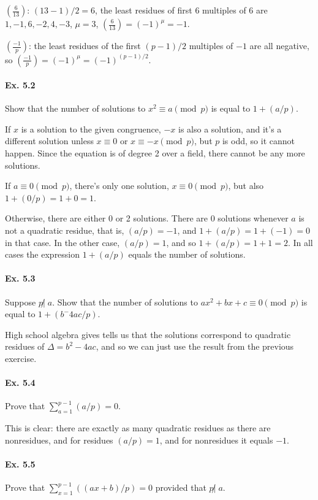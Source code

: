 \documentclass[notitlepage]{article}
\theoremstyle{definition}
\begin{document}
$\left(\frac{6}{13}\right)$: $(13-1)/2 = 6$, the least residues of
first $6$ multiples of $6$ are $1, -1, 6, -2, 4, -3$, $\mu = 3$,
$\left(\frac{6}{13}\right) = (-1)^\mu = -1$.

$\left(\frac{-1}{p}\right)$: the least residues of the first $(p-1)/2$
multiples of $-1$ are all negative, so $\left(\frac{-1}{p}\right) =
(-1)^\mu = (-1)^{(p-1)/2}$.

\paragraph{Ex. 5.2}
Show that the number of solutions to $x^2 \equiv a \pmod p$ is equal
to $1 + (a/p)$.

If $x$ is a solution to the given congruence, $-x$ is also a solution,
and it's a different solution unless $x \equiv 0$ or $x \equiv -x
\pmod p$, but $p$ is odd, so it cannot happen. Since the equation is
of degree 2 over a field, there cannot be any more solutions.

If $a \equiv 0 \pmod p$, there's only one solution, $x \equiv 0 \pmod
p$, but also $1+(0/p) = 1+0 = 1$.
 
Otherwise, there are either 0 or 2 solutions. There are 0 solutions
whenever $a$ is not a quadratic residue, that is, $(a/p) = -1$, and $1
+ (a/p) = 1 + (-1) = 0$ in that case. In the other case, $(a/p) = 1$,
and so $1 + (a/p) = 1 + 1 = 2$. In all cases the expression $1 +
(a/p)$ equals the number of solutions.

\paragraph{Ex. 5.3}
Suppose $p \not | \; a$. Show that the number of solutions to $a x^2 +
bx + c \equiv 0 \pmod p$ is equal to $1 + (b^ - 4ac/p)$.

High school algebra gives tells us that the solutions correspond to
quadratic residues of $\Delta = b^2 - 4ac$, and so we can just use the
result from the previous exercise.

\paragraph{Ex. 5.4}
Prove that $\sum_{a=1}^{p-1} (a/p) = 0$.

This is clear: there are exactly as many quadratic residues as there
are nonresidues, and for residues $(a/p) = 1$, and for nonresidues it
equals $-1$.

\paragraph{Ex. 5.5}
Prove that $\sum_{x=1}^{p-1} ((ax + b)/p) = 0$ provided that $p \not | \; a$.
\end{document}

